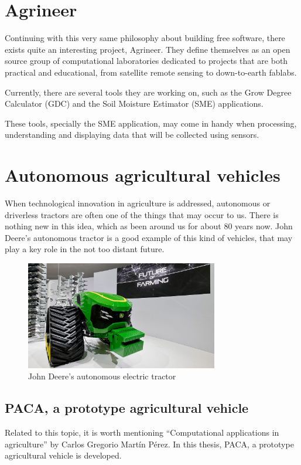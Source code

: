 \section{Agrineer}
Continuing with this very same philosophy about building free software, there exists quite an interesting project, Agrineer. They define themselves as an open source group of computational laboratories dedicated to projects that are both practical and educational, from satellite remote sensing to down-to-earth fablabs\cite{agrineer}.

Currently, there are several tools they are working on, such as the Grow Degree Calculator (GDC) and the Soil Moisture Estimator (SME) applications.

These tools, specially the SME application, may come in handy when processing, understanding and displaying data that will be collected using sensors.


\section{Autonomous agricultural vehicles}
When technological innovation in agriculture is addressed, autonomous or driverless tractors are often one of the things that may occur to us. There is nothing new in this idea, which as been around us for about 80 years now. John Deere's autonomous tractor\cite{deere-tractor} is a good example of this kind of vehicles, that may play a key role in the not too distant future.

\begin{figure}[htp]
    \centering
    \includegraphics[width=0.75\textwidth]{fig/deere-tractor.jpg}
    \caption{John Deere’s autonomous electric tractor}
    \label{fig:deere-tractor}
\end{figure}

\subsection{PACA, a prototype agricultural vehicle}
Related to this topic, it is worth mentioning ``Computational applications in agriculture'' \cite{paca} by Carlos Gregorio Martín Pérez. In this thesis, PACA, a prototype agricultural vehicle is developed.

